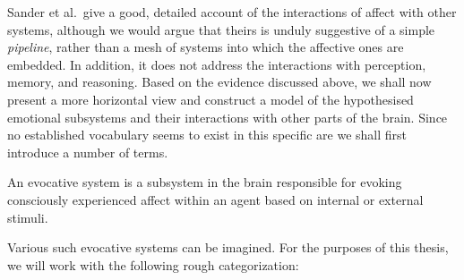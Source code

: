 Sander et al.\ give a good, detailed account of the interactions of affect with other systems, although we would argue that theirs is unduly suggestive of a simple {\em pipeline}, rather than a mesh of systems into which the affective ones are embedded. In addition, it does not address the interactions with perception, memory, and reasoning. Based on the evidence discussed above, we shall now present a more horizontal view and construct a model of the hypothesised emotional subsystems and their interactions with other parts of the brain. Since no established vocabulary seems to exist in this specific are we shall first introduce a number of terms.

\begin{definition}
An evocative system is a subsystem in the brain responsible for evoking consciously experienced affect within an agent based on internal or external stimuli.
\end{definition} 
\vspace{-2mm}
Various such evocative systems can be imagined. For the purposes of this thesis, we will work with the following rough categorization:

